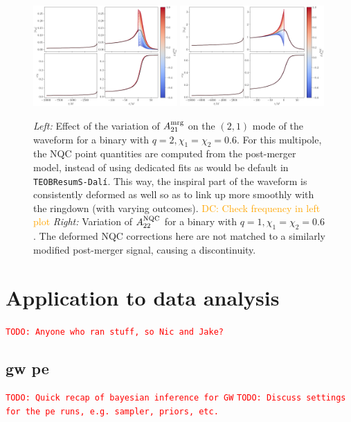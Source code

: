 \documentclass[prd,amssymb,amsmath,amsfonts,nofootinbib,reprint,showpacs,longbibliography]{revtex4-1}
\newcommand{\DC}[1]{{\textcolor{orange}{{DC: #1}} }}
\newcommand{\todo}[1]{\textcolor{red}{\texttt{TODO: #1}}}
\newcommand{\amrg}[1]{{A_{#1}^{\rm mrg}}}
\newcommand{\anqc}[1]{{A_{#1}^{\rm NQC}}}
\newcommand{\dali}[0]{\texttt{TEOBResumS-Dalí}}
\begin{document}
\begin{figure}
    \includegraphics[width=0.49\textwidth]{figs/delta_A21_mrg_-0.8_1.0.png}
    \includegraphics[width=0.49\textwidth]{figs/delta_A22_nqc_-0.8_1.0.png}
    \caption{\label{fig:bad_dev_mrgnqc}
    \textit{Left:} Effect of the variation of $\amrg{21}$ on the $(2,1)$ mode of the waveform
    for a binary with $q = 2, \chi_1 = \chi_2 = 0.6$.
    For this multipole, the NQC point quantities are computed from the post-merger model, instead of using
    dedicated fits as would be default in \dali. This way, the inspiral part of the waveform is
    consistently deformed as well so as to link up more smoothly with the ringdown (with varying outcomes).
    \DC{Check frequency in left plot}
    \textit{Right:} Variation of $\anqc{22}$ for a binary with $q = 1, \chi_1 = \chi_2 = 0.6$. The
    deformed NQC corrections here are not matched to a similarly modified post-merger signal, causing a discontinuity.}
\end{figure}

\section{Application to data analysis}
\todo{Anyone who ran stuff, so Nic and Jake? }

\subsection{\ac{gw} \ac{pe}}
\todo{Quick recap of bayesian inference for GW}
\todo{Discuss settings for the \ac{pe} runs, e.g. sampler, priors, etc.}
\end{document}
